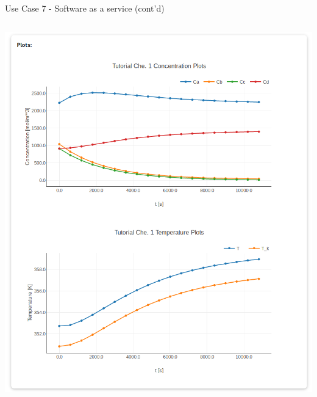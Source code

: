 \documentclass[compress,newPxFont,sthlmFooter]{beamer}
\begin{document}
\begin{frame}[plain]{Use Case 7 - Software as a service (cont'd)}
\begin{columns}[t]
      \begin{column}{0.45\paperwidth}
        \begin{center}
            \includegraphics[align=c, width=\textwidth]{daetools_ws_html_plots.png}
        \end{center}
      \end{column}
    \end{columns}
\end{frame}
\end{document}
